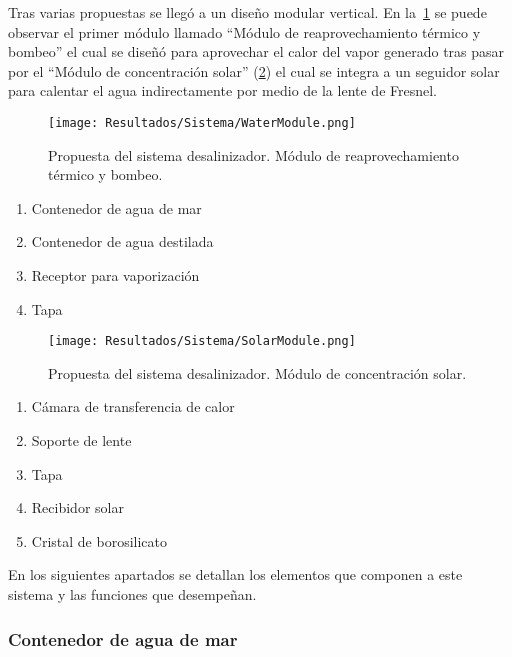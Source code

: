			Tras varias propuestas se llegó a un diseño modular vertical. En la~\cref{fig:WaterModule} se puede observar el primer módulo llamado ``Módulo de reaprovechamiento térmico y bombeo'' el cual se diseñó para aprovechar el calor del vapor generado tras pasar por el ``Módulo de concentración solar'' (\cref{fig:SolarModule}) el cual se integra a un seguidor solar para calentar el agua indirectamente por medio de la lente de Fresnel.
		
		
			\begin{figure}[H]
				\centering
				\texttt{[image: Resultados/Sistema/WaterModule.png]}
				\caption{Propuesta del sistema desalinizador. Módulo de reaprovechamiento térmico y bombeo.}
				\label{fig:WaterModule}
			\end{figure}
			
			\begin{enumerate}
				\item Contenedor de agua de mar
				\item Contenedor de agua destilada
				\item Receptor para vaporización
				\item Tapa
			\end{enumerate}
			
			\begin{figure}[H]
				\centering
				\texttt{[image: Resultados/Sistema/SolarModule.png]}
				\caption{Propuesta del sistema desalinizador. Módulo de concentración solar.}
				\label{fig:SolarModule}
			\end{figure}
			
			\begin{enumerate}
				\item Cámara de transferencia de calor
				\item Soporte de lente
				\item Tapa
				\item Recibidor solar
				\item Cristal de borosilicato
			\end{enumerate}
			
			En los siguientes apartados se detallan los elementos que componen a este sistema y las funciones que desempeñan.
	
			\subsubsection{Contenedor de agua de mar}
				
